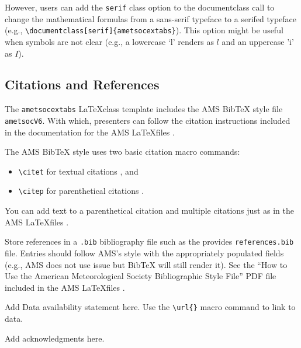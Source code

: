 \documentclass[9pt]{ametsocextabs}
\begin{document}
However, users can add the \texttt{serif} class option to the
documentclass call to change the mathematical formulas from a
sans-serif typeface to a serifed typeface (e.g.,
\texttt{\textbackslash documentclass[serif]\{ametsocextabs\}}). This
option might be useful when symbols are not clear (e.g., a lowercase
`l' renders as $l$ and an uppercase 'i' as $I$).

\subsection{Citations and References}
The \lowercase{\texttt{ametsocextabs}} \LaTeX class template
includes the AMS BibTeX style file \texttt{ametsocV6}. With which,
presenters can follow the citation instructions included in the
documentation for the AMS \LaTeX files \cite{AMS2025latex, AMS2025doc}.

The AMS BibTeX style uses two basic citation macro commands:
\begin{itemize}
    \item \texttt{\textbackslash citet} for textual citations \rightarrow \citet{Eliassen1951}, and
    \item \texttt{\textbackslash citep} for parenthetical citations  \rightarrow \citep{Eliassen1951}.
\end{itemize}
You can add text to a parenthetical citation and multiple
citations just as in the AMS \LaTeX files
\citep[e.g.,][]{Eliassen1951,AMS2025latex, AMS2025doc}.

Store references in a \texttt{.bib} bibliography file such as the
provides \texttt{references.bib} file. Entries should follow AMS's
style with the appropriately populated fields (e.g., AMS does not
use issue but BibTeX will still render it). See the ``How to Use the
American Meteorological Society Bibliographic Style File'' PDF file
included in the AMS \LaTeX files \cite{AMS2025latex, AMS2025doc}.

%
\datastatement
Add Data availability statement here. Use the
\texttt{\textbackslash url\{\}} macro command to link to data.

%
\acknowledgments
Add acknowledgments here.



\end{document}
